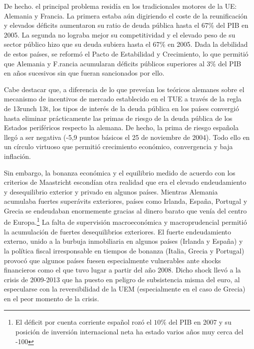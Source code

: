 \documentclass[10pt,a4paper]{article}
\begin{document}
De hecho. el principal problema residía en los tradicionales motores de la UE: Alemania y Francia. La primera estaba aún digiriendo el coste de la reunificación y elevados déficits aumentaron su ratio de deuda pública hasta el 67\% del PIB en 2005. La segunda no lograba mejor su competitividad y el elevado peso de su sector público hizo que su deuda subiera hasta el 67\% en 2005. Dada la debilidad de estos países, se reformó el Pacto de Estabilidad y Crecimiento, lo que permitió que Alemania y F.rancia acumularan déficits públicos superiores al 3\% del PIB en años sucesivos sin que fueran sancionados por ello. 

Cabe destacar que, a diferencia de lo que preveían los teóricos alemanes sobre el mecanismo de incentivos de mercado establecido en el TUE a través de la regla de 13runch 13t, los tipos de interés de la deuda pública en los países convergió hasta eliminar prácticamente las primas de riesgo de la deuda pública de los Estados periféricos respecto la alemana. De hecho, la prima de riesgo española llegó a ser negativa (-5,9 puntos básicos el 25 de noviembre de 2004). Todo ello en un círculo virtuoso que permitió crecimiento económico, convergencia y baja inflación.

Sin embargo, la bonanza económica y el equilibrio medido de acuerdo con los criterios de Maastricht escondían otra realidad que era el elevado endeudamiento y desequilibrio exterior y privado en algunos países. Mientras Alemania acumulaba fuertes superávits exteriores, países como Irlanda, España, Portugal y Grecia se endeudaban enormemente gracias al dinero barato que venía del centro de Europa.\footnote{%
    El déficit por cuenta corriente español rozó el $10\%$ del PIB en 2007 y su posición de inversión internacional neta ha estado varios años muy cerca del -100%
} La falta de supervisión macroeconómica y macroprudencial permitió la acumulación de fuertes desequilibrios exteriores. El fuerte endeudamiento externo, unido a la burbuja inmobiliaria en algunos países (Irlanda y España) y la política fiscal irresponsable en tiempos de bonanza (Italia, Grecia y Portugal) provocó que algunos países fuesen especialmente vulnerables ante shocks financieros como el que tuvo lugar a partir del año 2008. Dicho shock llevó a la crisis de 2009-2013 que ha puesto en peligro de subsistencia misma del euro, al especularse con la reversibilidad de la UEM (especialmente en el caso de Grecia) en el peor momento de la crisis.
\end{document}
